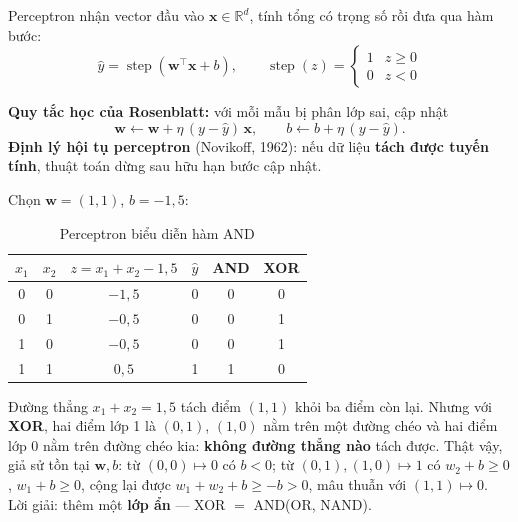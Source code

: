 \begin{definition}[Perceptron]
Perceptron nhận vector đầu vào $\mathbf{x} \in \mathbb{R}^d$, tính tổng có trọng số rồi đưa qua hàm bước:
\begin{equation}
    \hat{y} = \operatorname{step}(\mathbf{w}^{\top}\mathbf{x} + b), \qquad \operatorname{step}(z) = \begin{cases} 1 & z \geq 0 \\ 0 & z < 0 \end{cases}
\end{equation}
\end{definition}

\noindent\textbf{Quy tắc học của Rosenblatt:} với mỗi mẫu bị phân lớp sai, cập nhật
\begin{equation}
    \mathbf{w} \leftarrow \mathbf{w} + \eta\,(y - \hat{y})\,\mathbf{x}, \qquad b \leftarrow b + \eta\,(y - \hat{y}).
\end{equation}
\textbf{Định lý hội tụ perceptron} (Novikoff, 1962): nếu dữ liệu \textbf{tách được tuyến tính}, thuật toán dừng sau hữu hạn bước cập nhật.


\begin{example}
Chọn $\mathbf{w} = (1, 1)$, $b = -1{,}5$:
\end{example}

\begin{table}[H]
\centering
\begin{tabular}{|c|c|c|c|c|c|}
\hline
$x_1$ & $x_2$ & $z = x_1 + x_2 - 1{,}5$ & $\hat{y}$ & AND & XOR \\
\hline
0 & 0 & $-1{,}5$ & 0 & 0 & 0 \\ \hline
0 & 1 & $-0{,}5$ & 0 & 0 & 1 \\ \hline
1 & 0 & $-0{,}5$ & 0 & 0 & 1 \\ \hline
1 & 1 & $0{,}5$ & 1 & 1 & 0 \\ \hline
\end{tabular}
\caption{Perceptron biểu diễn hàm AND}
\label{tab:and}
\end{table}

Đường thẳng $x_1 + x_2 = 1{,}5$ tách điểm $(1, 1)$ khỏi ba điểm còn lại. Nhưng với \textbf{XOR}, hai điểm lớp 1 là $(0, 1)$, $(1, 0)$ nằm trên một đường chéo và hai điểm lớp 0 nằm trên đường chéo kia: \textbf{không đường thẳng nào} tách được. Thật vậy, giả sử tồn tại $\mathbf{w}, b$: từ $(0, 0) \mapsto 0$ có $b < 0$; từ $(0, 1), (1, 0) \mapsto 1$ có $w_2 + b \geq 0$, $w_1 + b \geq 0$, cộng lại được $w_1 + w_2 + b \geq -b > 0$, mâu thuẫn với $(1, 1) \mapsto 0$. Lời giải: thêm một \textbf{lớp ẩn} --- XOR $= $ AND(OR, NAND).

